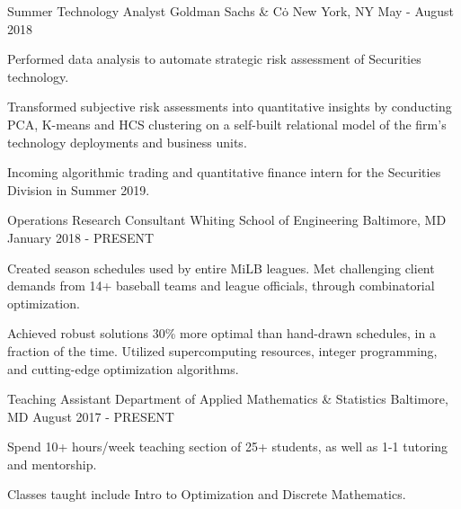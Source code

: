 
\begin{cventries}

  \cventry
    {Summer Technology Analyst} %
    {Goldman Sachs \& Co\. } %
    {New York, NY} %
    {May - August 2018} %
    {
      \begin{cvitems} %
        \item   { Performed data analysis to automate strategic risk assessment of Securities technology.}
        \item { Transformed subjective risk assessments into quantitative insights by conducting PCA, K-means and HCS clustering on a self-built relational model of the firm's technology deployments and business units.
        }
        \item {Incoming algorithmic trading and quantitative finance intern for the Securities Division in Summer 2019. }
      \end{cvitems}
    }
  
  \cventry
    {Operations Research Consultant} %
    {Whiting School of Engineering} %
    {Baltimore, MD} %
    {January 2018 - PRESENT} %
    {
      \begin{cvitems} 
        \item { Created season schedules used by entire MiLB leagues. Met challenging client demands from 14+ baseball teams and league officials, through combinatorial optimization. }
        \item { Achieved robust solutions 30\% more optimal than hand-drawn schedules, in a fraction of the time. Utilized supercomputing resources, integer programming, and cutting-edge optimization algorithms.}
      \end{cvitems}
    }
   
  \cventry
    {Teaching Assistant} %
    {Department of Applied Mathematics \& Statistics} %
    {Baltimore, MD} %
    {August 2017 - PRESENT} %
    {
      \begin{cvitems} 
        \item { Spend 10+ hours/week teaching section of 25+ students, as well as 1-1 tutoring and mentorship.}
        \item {Classes taught include Intro to Optimization and Discrete Mathematics.}
      \end{cvitems}
    }
  
\end{cventries}